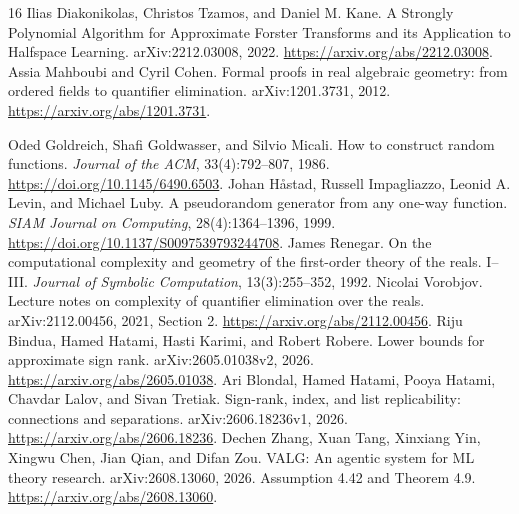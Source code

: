 \documentclass[11pt]{article}
\newcommand{\1}{\mathbf 1}
\begin{document}
\begin{thebibliography}{16}
 Ilias Diakonikolas, Christos Tzamos, and Daniel M. Kane. A Strongly Polynomial Algorithm for Approximate Forster Transforms and its Application to Halfspace Learning. arXiv:2212.03008, 2022. \url{https://arxiv.org/abs/2212.03008}.
 Assia Mahboubi and Cyril Cohen. Formal proofs in real algebraic geometry: from ordered fields to quantifier elimination. arXiv:1201.3731, 2012. \url{https://arxiv.org/abs/1201.3731}.

 Oded Goldreich, Shafi Goldwasser, and Silvio Micali. How to construct random functions. \emph{Journal of the ACM}, 33(4):792--807, 1986. \url{https://doi.org/10.1145/6490.6503}.
 Johan H{\aa}stad, Russell Impagliazzo, Leonid A. Levin, and Michael Luby. A pseudorandom generator from any one-way function. \emph{SIAM Journal on Computing}, 28(4):1364--1396, 1999. \url{https://doi.org/10.1137/S0097539793244708}.
 James Renegar. On the computational complexity and geometry of the first-order theory of the reals. I--III. \emph{Journal of Symbolic Computation}, 13(3):255--352, 1992.
 Nicolai Vorobjov. Lecture notes on complexity of quantifier elimination over the reals. arXiv:2112.00456, 2021, Section 2. \url{https://arxiv.org/abs/2112.00456}.
 Riju Bindua, Hamed Hatami, Hasti Karimi, and Robert Robere. Lower bounds for approximate sign rank. arXiv:2605.01038v2, 2026. \url{https://arxiv.org/abs/2605.01038}.
 Ari Blondal, Hamed Hatami, Pooya Hatami, Chavdar Lalov, and Sivan Tretiak. Sign-rank, index, and list replicability: connections and separations. arXiv:2606.18236v1, 2026. \url{https://arxiv.org/abs/2606.18236}.
 Dechen Zhang, Xuan Tang, Xinxiang Yin, Xingwu Chen, Jian Qian, and Difan Zou. VALG: An agentic system for ML theory research. arXiv:2608.13060, 2026. Assumption 4.42 and Theorem 4.9. \url{https://arxiv.org/abs/2608.13060}.

\end{thebibliography}
\end{document}
